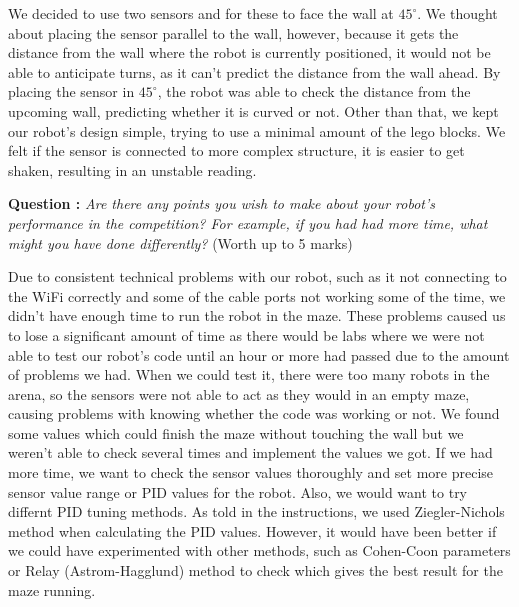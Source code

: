 \documentclass[hidelinks,a4paper,11pt]{article}
\newcounter{question}
\newcommand\myq{\refstepcounter{question}\thequestion}
\begin{document}
\begin{mdframed}
\begin{center}
		\end{center}
		We decided to use two sensors and for these to face the wall at $45^{\circ}$. We thought about placing the sensor parallel to the wall, however, because it gets the distance from the wall where the robot is currently positioned, it would not be able to anticipate turns, as it can't predict the distance from the wall ahead. By placing the sensor in $45^{\circ}$, the robot was able to check the distance from the upcoming wall, predicting whether it is curved or not. Other than that, we kept our robot's design simple, trying to use a minimal amount of the lego blocks. We felt if the sensor is connected to more complex structure, it is easier to get shaken, resulting in an unstable reading.
	\end{mdframed}
	\vspace*{\baselineskip}
	
	{\bfseries Question \myq:}  \emph{Are there any points you wish to make about your robot's performance in the competition?  For example, if you had had more time, what might you have done differently?} (Worth up to 5 marks)\\
	\begin{mdframed}
		Due to consistent technical problems with our robot, such as it not connecting to the WiFi correctly and some of the cable ports not working some of the time, we didn't have enough time to run the robot in the maze. These problems caused us to lose a significant amount of time as there would be labs where we were not able to test our robot's code until an hour or more had passed due to the amount of problems we had. When we could test it, there were too many robots in the arena, so the sensors were not able to act as they would in an empty maze, causing problems with knowing whether the code was working or not. We found some values which could finish the maze without touching the wall but we weren't able to check several times and implement the values we got. If we had more time, we want to check the sensor values thoroughly and set more precise sensor value range or PID values for the robot. Also, we would want to try differnt PID tuning methods. As told in the instructions, we used Ziegler-Nichols method when calculating the PID values. However, it would have been better if we could have experimented with other methods, such as Cohen-Coon parameters or Relay (Astrom-Hagglund) method to check which gives the best result for the maze running.
	\end{mdframed}
	\vspace*{\baselineskip}
	
\end{document}
